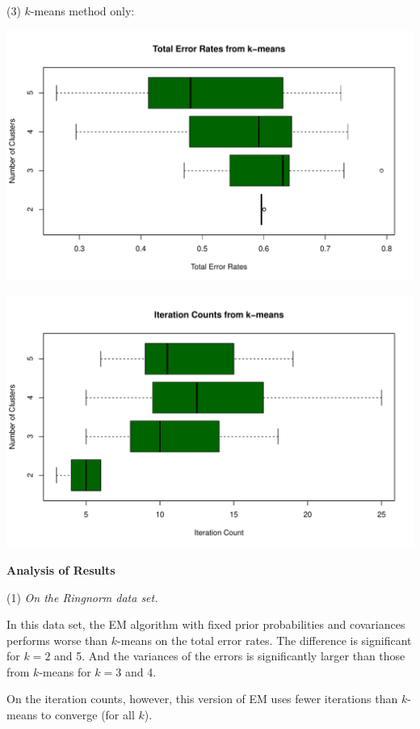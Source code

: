 \documentclass[a4paper,12pt]{article}
\newcommand{\km}{$k$-means }
\begin{document}
\noindent (3) $k$-means method only:
\begin{center}
  \includegraphics[width=0.8\linewidth]{Image/Prob3-TotalErr-Ionosphere-kmeans.pdf}
\end{center}
\begin{center}
  \includegraphics[width=0.8\linewidth]{Image/Prob3-ItrCount-Ionosphere-kmeans.pdf}
\end{center}





\bigskip
\begin{center}
    \textcolor{mydarkgreen}{\textbf{Analysis of Results}}
\end{center}

\noindent 
(1) \emph{On the Ringnorm data set.}

In this data set, the EM algorithm with fixed prior probabilities and covariances performs worse than $k$-means on the total error rates.
The difference is significant for $k=2$ and 5. And the variances of the errors is significantly larger than those from \km for $k=3$ and 4.



On the iteration counts, however, this version of EM uses fewer iterations than \km to converge (for all $k$). 
\bigskip\bigskip
\end{document}

